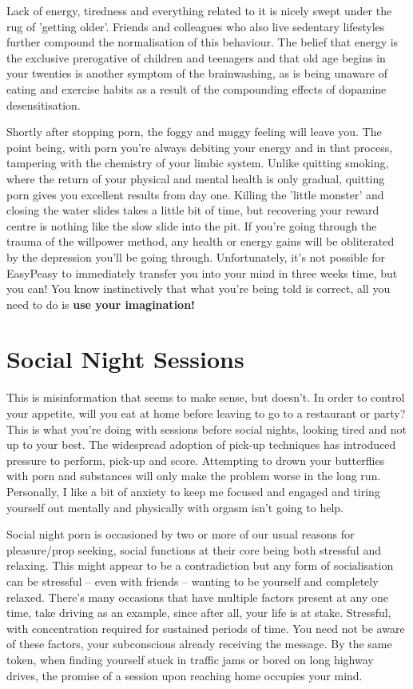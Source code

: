\documentclass[
]{book}
\begin{document}
Lack of energy, tiredness and everything related to it is nicely swept under the rug of 'getting older'. Friends and colleagues who also live sedentary lifestyles further compound the normalisation of this behaviour. The belief that energy is the exclusive prerogative of children and teenagers and that old age begins in your twenties is another symptom of the brainwashing, as is being unaware of eating and exercise habits as a result of the compounding effects of dopamine desensitisation.

Shortly after stopping porn, the foggy and muggy feeling will leave you. The point being, with porn you're always debiting your energy and in that process, tampering with the chemistry of your limbic system. Unlike quitting smoking, where the return of your physical and mental health is only gradual, quitting porn gives you excellent results from day one. Killing the 'little monster' and closing the water slides takes a little bit of time, but recovering your reward centre is nothing like the slow slide into the pit. If you're going through the trauma of the willpower method, any health or energy gains will be obliterated by the depression you'll be going through. Unfortunately, it's not possible for EasyPeasy to immediately transfer you into your mind in three weeks time, but you can! You know instinctively that what you're being told is correct, all you need to do is \textbf{use your imagination!}

\hypertarget{social-night-sessions}{%
\section{Social Night Sessions}\label{social-night-sessions}}

This is misinformation that seems to make sense, but doesn't. In order to control your appetite, will you eat at home before leaving to go to a restaurant or party? This is what you're doing with sessions before social nights, looking tired and not up to your best. The widespread adoption of pick-up techniques has introduced pressure to perform, pick-up and score. Attempting to drown your butterflies with porn and substances will only make the problem worse in the long run. Personally, I like a bit of anxiety to keep me focused and engaged and tiring yourself out mentally and physically with orgasm isn't going to help.

Social night porn is occasioned by two or more of our usual reasons for pleasure/prop seeking, social functions at their core being both stressful and relaxing. This might appear to be a contradiction but any form of socialisation can be stressful -- even with friends -- wanting to be yourself and completely relaxed. There's many occasions that have multiple factors present at any one time, take driving as an example, since after all, your life is at stake. Stressful, with concentration required for sustained periods of time. You need not be aware of these factors, your subconscious already receiving the message. By the same token, when finding yourself stuck in traffic jams or bored on long highway drives, the promise of a session upon reaching home occupies your mind.
\end{document}

